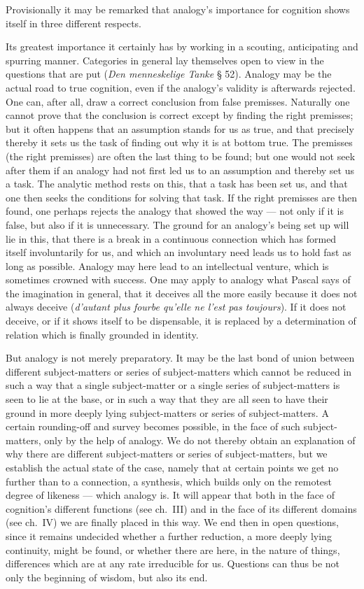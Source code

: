 \documentclass[12pt]{book}
\newcommand{\opage}[1]{\marginnote{\footnotesize\textit{[#1]}}}
\begin{document}
Provisionally it may be remarked that analogy's importance for cognition shows
itself in three different respects.

Its greatest importance it certainly has by working in a scouting,
anticipating and spurring manner. Categories in general lay themselves open to
view in the questions that are put (\textit{Den menneskelige Tanke} § 52).
Analogy may be the actual road to true cognition, even if the analogy's
validity is afterwards rejected. One can, after all, draw a correct conclusion
from false premisses. Naturally one cannot prove that the conclusion is correct
except by finding the right \opage{6}premisses; but it often happens that an assumption
stands for us as true, and that precisely thereby it sets us the task of
finding out why it is at bottom true. The premisses (the right premisses) are
often the last thing to be found; but one would not seek after them if an
analogy had not first led us to an assumption and thereby set us a task. The
analytic method rests on this, that a task has been set us, and that one then
seeks the conditions for solving that task. If the right premisses are then
found, one perhaps rejects the analogy that showed the way --- not only if it
is false, but also if it is unnecessary. The ground for an analogy's being set
up will lie in this, that there is a break in a continuous connection which has
formed itself involuntarily for us, and which an involuntary need leads us to
hold fast as long as possible. Analogy may here lead to an intellectual
venture, which is sometimes crowned with success. One may apply to analogy what
Pascal says of the imagination in general, that it deceives all the more easily
because it does not always deceive (\textit{d'autant plus fourbe qu'elle ne
l'est pas toujours}). If it does not deceive, or if it shows itself to be
dispensable, it is replaced by a determination of relation which is finally
grounded in identity.

But analogy is not merely preparatory. It may be the last bond of union between
different subject-matters or series of subject-matters which cannot be reduced
in such a way that a single subject-matter or a single series of
subject-matters is seen to lie at the base, or in such a way that they are all
seen to have their ground in more deeply lying subject-matters or series of
subject-matters. A certain rounding-off and survey becomes possible, in the
face of such subject-matters, only by the help of analogy. We do not thereby
obtain an explanation of why there are different subject-matters or series of
subject-matters, but \opage{7}we establish the actual state of the case, namely that at
certain points we get no further than to a connection, a synthesis, which
builds only on the remotest degree of likeness --- which analogy is. It will
appear that both in the face of cognition's different functions (see ch.\ III)
and in the face of its different domains (see ch.\ IV) we are finally placed in
this way. We end then in open questions, since it remains undecided whether a
further reduction, a more deeply lying continuity, might be found, or whether
there are here, in the nature of things, differences which are at any rate
irreducible for us. Questions can thus be not only the beginning of wisdom, but
also its end.
\end{document}
